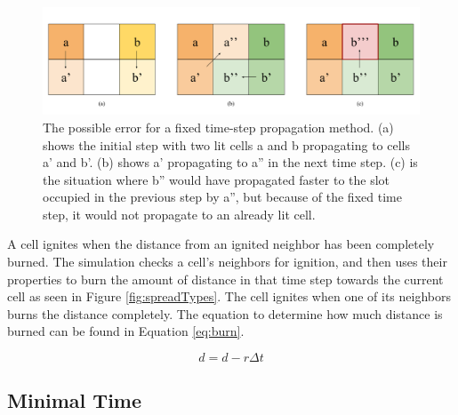 \begin{figure}
\centering
  \includegraphics[width=\linewidth]{figures/implementation/Acceleration_error.png}
  \caption{The possible error for a fixed time-step propagation method. (a) shows the initial step with two lit cells a and b propagating to cells a' and b'. (b) shows a' propagating to a'' in the next time step. (c) is the situation where b'' would have propagated faster to the slot occupied in the previous step by a'', but because of the fixed time step, it would not propagate to an already lit cell.}
  \label{fig:accerr}
\end{figure}

A cell ignites when the distance from an ignited neighbor has been completely burned. The simulation checks a cell's neighbors for ignition, and then uses their properties to burn the amount of distance in that time step towards the current cell as seen in Figure \ref{fig:spreadTypes}. The cell ignites when one of its neighbors burns the distance completely. The equation to determine how much distance is burned can be found in Equation \ref{eq:burn}. 

\begin{equation}
d = d - r \Delta t
\label{eq:burn}
\end{equation}




\subsection{Minimal Time}

